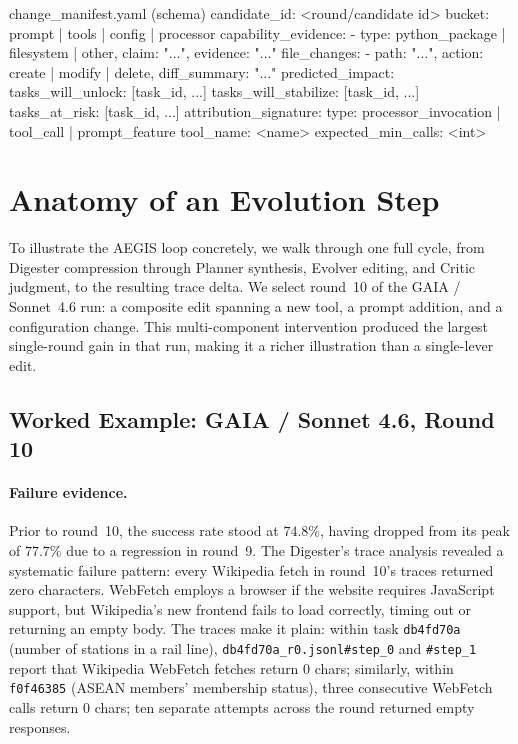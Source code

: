 \begin{manifestfile}{change\_manifest.yaml (schema)}
candidate_id: <round/candidate id>
bucket: prompt | tools | config | processor
capability_evidence:
  - {type: python_package | filesystem | other, claim: "...", evidence: "..."}
file_changes:
  - {path: "...", action: create | modify | delete, diff_summary: "..."}
predicted_impact:
  tasks_will_unlock:    [task_id, ...]
  tasks_will_stabilize: [task_id, ...]
  tasks_at_risk:        [task_id, ...]
attribution_signature:
  type: processor_invocation | tool_call | prompt_feature
  tool_name: <name>
  expected_min_calls: <int>
\end{manifestfile}

\section{Anatomy of an Evolution Step}
\label{app:anatomy}

To illustrate the AEGIS loop concretely, we walk through one full cycle, from Digester compression through Planner synthesis, Evolver editing, and Critic judgment, to the resulting trace delta. We select round~10 of the GAIA / Sonnet~4.6 run: a composite edit spanning a new tool, a prompt addition, and a configuration change. This multi-component intervention produced the largest single-round gain in that run, making it a richer illustration than a single-lever edit.


\subsection{Worked Example: GAIA / Sonnet 4.6, Round 10}
\label{app:worked-example}

\paragraph{Failure evidence.} Prior to round~10, the success rate stood at
$74.8\%$, having dropped from its peak of $77.7\%$ due to a regression in
round~9. The Digester's trace analysis revealed a systematic failure pattern: every Wikipedia fetch in round~10's traces returned zero characters. WebFetch employs a browser if the
website requires JavaScript support, but Wikipedia's new frontend fails to load
correctly, timing out or returning an empty body. The traces make it plain:
within task \texttt{db4fd70a} (number of stations in a rail line),
\texttt{db4fd70a\_r0.jsonl\#step\_0} and \texttt{\#step\_1} report that
Wikipedia WebFetch fetches return 0 chars; similarly, within
\texttt{f0f46385} (ASEAN members' membership status), three consecutive
WebFetch calls return 0 chars; ten separate attempts across the round returned empty responses.

